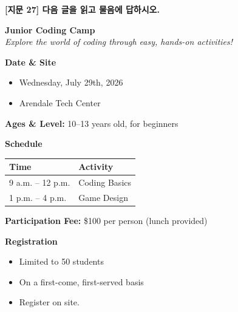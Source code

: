 \documentclass[11pt,a4paper]{article}
\begin{document}
\begin{center}
{\fontsize{15}{17}\selectfont\sffamily\bfseries [지문 27] 다음 글을 읽고 물음에 답하시오.}
\end{center}
\vspace{4pt}

\begin{pbox}
\begin{center}
{\large\bfseries Junior Coding Camp}\\[4pt]
{\itshape Explore the world of coding through easy, hands-on activities!}
\end{center}

\vspace{6pt}
\textbf{Date \& Site}
\begin{itemize}[leftmargin=1.8em,itemsep=1pt,topsep=2pt,parsep=0pt]
  \item[\textbullet] Wednesday, July 29th, 2026
  \item[\textbullet] Arendale Tech Center
\end{itemize}

\vspace{4pt}
\textbf{Ages \& Level:} 10--13 years old, for beginners

\vspace{4pt}
\textbf{Schedule}

\vspace{2pt}
\begin{tabular}{@{\hspace{1em}}ll}
\toprule
\textbf{Time} & \textbf{Activity} \\
\midrule
9 a.m. -- 12 p.m. & Coding Basics \\
1 p.m. -- 4 p.m.  & Game Design \\
\bottomrule
\end{tabular}

\vspace{4pt}
\textbf{Participation Fee:} \$100 per person (lunch provided)

\vspace{4pt}
\textbf{Registration}
\begin{itemize}[leftmargin=1.8em,itemsep=1pt,topsep=2pt,parsep=0pt]
  \item[\textbullet] Limited to 50 students
  \item[\textbullet] On a first-come, first-served basis
  \item[\textbullet] Register on site.
\end{itemize}
\end{pbox}
\end{document}
